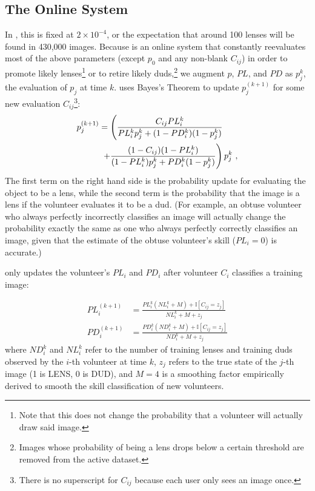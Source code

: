 \documentclass[useAMS,usenatbib,a4paper]{mn2e}
\begin{document}
\subsection{The Online System}
\label{sec:formalism:online}
In \sw, this is fixed at $2 \times 10^{-4}$, or the expectation that
around 100 lenses will be found in 430,000 images. Because \sw is an online
system that constantly reevaluates most of the above parameters (except $p_0$
and any non-blank $C_{ij}$) in order to promote likely lenses\footnote{Note
that this does not change the probability that a volunteer will actually draw
said image.} or to retire likely duds,\footnote{Images whose probability of
being a lens drops below a certain threshold are removed from the active
dataset.} we augment $p$, $PL$, and $PD$ as $p_j^k$, the evaluation of
$p_j$ at time $k$. \sw uses Bayes's Theorem to update $p_j^{(k + 1)}$ for
some new evaluation $C_{ij}$\footnote{There is no superscript for $C_{ij}$
because each user only sees an image once.}:
\begin{align}
  p_j^{(k + 1)} &= \left ( \frac{C_{ij} PL_{i}^{k}
  }{PL_{i}^{k} p_j^k + (1 - PD_{i}^{k})(1 -
  p_j^k)}
  \right. \notag \\ & \; \left . +
  \frac{(1 - C_{ij}) (1 - PL_{i}^{k})
  }{(1 - PL_{i}^{k}) p_j^k + PD_{i}^{k}(1 -
  p_j^k)} \right ) p_j^k \ ,
\end{align}
The first term on the right hand side is the probability update for evaluating
the object to be a lens, while the second term is the probability that the
image is a lens if the volunteer evaluates it to be a dud.  (For example, an
obtuse volunteer who always perfectly incorrectly classifies an image will
actually change the probability exactly the same as one who always perfectly
correctly classifies an image, given that the estimate of the obtuse
volunteer's skill ($PL_{i} = 0$) is accurate.)

\sw only updates the volunteer's $PL_{i}$ and $PD_{i}$ after volunteer $C_i$
classifies a training image:

\begin{align}
  PL_{i}^{(k + 1)} &= \frac{PL_{i}^{k} (NL_{i}^{k} + M) + \mathbb{I}[C_{ij} =
  z_{j}]}{NL_{i}^{k} + M + z_{j}} \\
  PD_{i}^{(k + 1)} &= \frac{PD_{i}^{k} (ND_{i}^{k} + M) + \mathbb{I}[C_{ij} =
  z_{j}]}{ND_{i}^{k} + M + z_{j}}
\end{align}
where $ND_{i}^{k}$ and $NL_{i}^{k}$ refer to the number of training lenses and
training duds observed by the $i$-th volunteer at time $k$, $z_{j}$ refers to
the true state of the $j$-th image (1 is LENS, 0 is DUD), and $M = 4$ is a
smoothing factor empirically derived to smooth the skill classification of new
volunteers.
\end{document}
